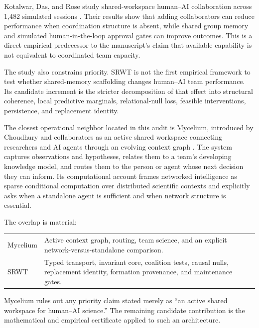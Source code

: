 Kotalwar, Das, and Rose study shared-workspace human--AI collaboration across
1,482 simulated sessions \cite{SRWT:KotalwarDasRose2026}. Their results show that
adding collaborators can reduce performance when coordination structure is
absent, while shared group memory and simulated human-in-the-loop approval
gates can improve outcomes. This is a direct empirical predecessor to the
manuscript's claim that available capability is not equivalent to coordinated
team capacity.

The study also constrains priority. SRWT is not the first empirical framework
to test whether shared-memory scaffolding changes human--AI team performance.
Its candidate increment is the stricter decomposition of that effect into
structural coherence, local predictive marginals, relational-null loss,
feasible interventions, persistence, and replacement identity.


The closest operational neighbor located in this audit is Mycelium, introduced
by Choudhury and collaborators as an active shared workspace connecting
researchers and AI agents through an evolving context graph
\cite{SRWT:ChoudhuryEtAl2026}. The system captures observations and hypotheses,
relates them to a team's developing knowledge model, and routes them to the
person or agent whose next decision they can inform. Its computational account
frames networked intelligence as sparse conditional computation over
distributed scientific contexts and explicitly asks when a standalone agent is
sufficient and when network structure is essential.

The overlap is material:
\begin{center}
\small
\begin{tabularx}{0.94\textwidth}{@{}p{}X@{}}
\toprule
Mycelium & Active context graph, routing, team science, and an explicit
network-versus-standalone comparison. \\
SRWT & Typed transport, invariant core, coalition tests, causal nulls,
replacement identity, formation provenance, and maintenance gates. \\
\bottomrule
\end{tabularx}
\end{center}
Mycelium rules out any priority claim stated merely as ``an active shared
workspace for human--AI science.'' The remaining candidate contribution is the
mathematical and empirical certificate applied to such an architecture.

